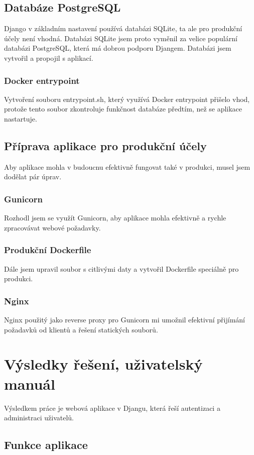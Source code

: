 \documentclass[12pt, a4paper,
twoside,        %
openright
]{report}
\begin{document}
\section{Databáze PostgreSQL}
\label{sec:databazepostgresql}
Django v základním nastavení používá databázi SQLite, ta ale pro produkční účely není vhodná. Databázi SQLite jsem proto vyměnil za velice populární databázi PostgreSQL, která má dobrou podporu Djangem. Databázi jsem vytvořil a propojil s aplikací.
\subsection{Docker entrypoint}
Vytvoření souboru entrypoint.sh, který využívá Docker entrypoint přišelo vhod, protože tento soubor zkontroluje funkčnost databáze předtím, než se aplikace nastartuje.

\section{Příprava aplikace pro produkční účely}
\label{sec:produkce}
Aby aplikace mohla v budoucnu efektivně fungovat také v produkci, musel jsem dodělat pár úprav.
\subsection{Gunicorn}
Rozhodl jsem se využít Gunicorn, aby aplikace mohla efektivně a rychle zpracovávat webové požadavky.
\subsection{Produkční Dockerfile}
Dále jsem upravil soubor s citlivými daty a vytvořil Dockerfile speciálně pro produkci.
\subsection{Nginx}
Nginx použitý jako reverse proxy pro Gunicorn mi umožnil efektivní přijímání požadavků od klientů a řešení statických souborů.

\chapter{Výsledky řešení, uživatelský manuál}
Výsledkem práce je webová aplikace v Djangu, která řeší autentizaci a administraci uživatelů.
\section{Funkce aplikace}
\label{sec:funkceaplikace}
\end{document}
